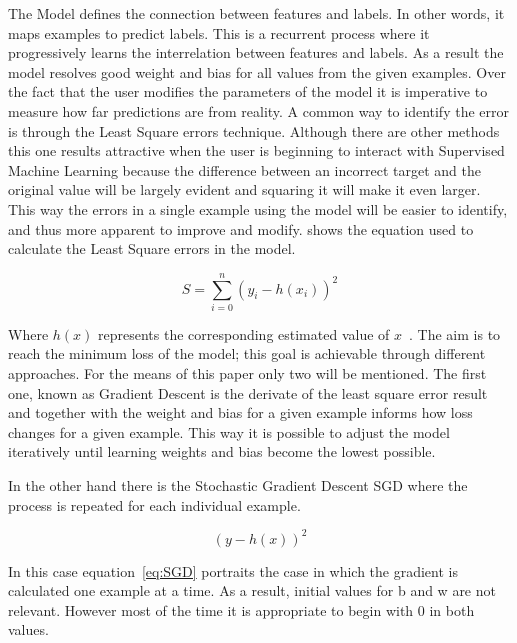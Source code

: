 The Model defines the connection between features and labels. In other words, it maps examples to predict labels. This is a recurrent process where it progressively learns the interrelation between features and labels. As a result the model resolves good weight and bias for all values from the given examples.  Over the fact that the user modifies the parameters of the model it is imperative to measure how far predictions are from reality.  A common way to identify the error is through the Least Square errors technique. Although there are other methods this one results attractive when the user is beginning to interact with Supervised Machine Learning because the difference between an incorrect target and the original value will be largely evident and squaring it will make it even larger. This way the errors in a single example using the model will be easier to identify, and thus more apparent to improve and modify. shows the equation used to calculate the Least Square errors in the model.

\begin{equation} \label{eq:L2loss equation}
\displaystyle
S = \sum_{i=0}^n (y_i - h(x_i))^2
\end{equation}



Where $h(x)$ represents the corresponding estimated value of $x$~\cite{rish15}.
The aim is to reach the minimum loss of the model; this goal is achievable through different approaches. For the means of this paper only two will be mentioned. The first one, known as Gradient Descent is the derivate of the least square error result and together with the weight and bias for a given example informs how loss changes for a given example. This way it is possible to adjust the model iteratively until learning weights and bias become the lowest possible. 

In the other hand there is the Stochastic Gradient Descent \ac{SGD} where the process is repeated for each individual example.

\begin{equation} \label{eq:SGD}
(y - h(x))^2
\end{equation}


In this case equation~\ref{eq:SGD} portraits the case in which the gradient is calculated one example at a time. As a result, initial values for b and w are not relevant. However most of the time it is appropriate to begin with 0 in both values.

